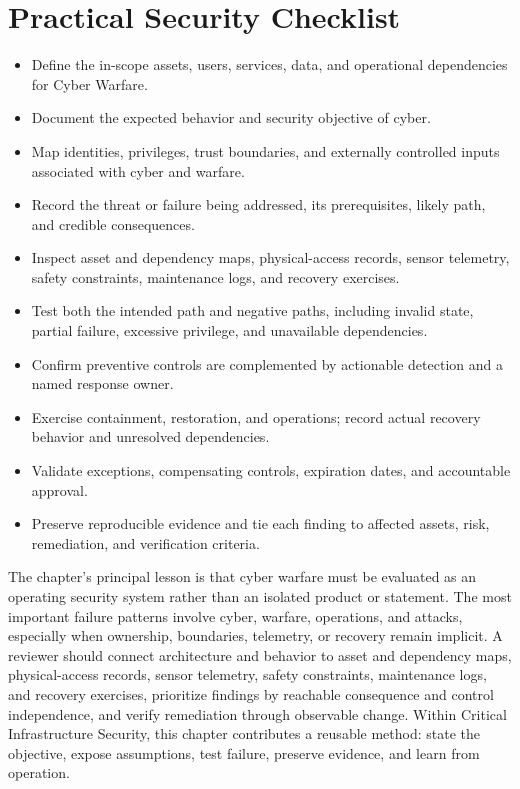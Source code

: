 \documentclass[11pt]{article}
\begin{document}
\section*{Practical Security Checklist}
\begin{itemize}[label=$\square$]
\item Define the in-scope assets, users, services, data, and operational dependencies for Cyber Warfare.
\item Document the expected behavior and security objective of cyber.
\item Map identities, privileges, trust boundaries, and externally controlled inputs associated with cyber and warfare.
\item Record the threat or failure being addressed, its prerequisites, likely path, and credible consequences.
\item Inspect asset and dependency maps, physical-access records, sensor telemetry, safety constraints, maintenance logs, and recovery exercises.
\item Test both the intended path and negative paths, including invalid state, partial failure, excessive privilege, and unavailable dependencies.
\item Confirm preventive controls are complemented by actionable detection and a named response owner.
\item Exercise containment, restoration, and operations; record actual recovery behavior and unresolved dependencies.
\item Validate exceptions, compensating controls, expiration dates, and accountable approval.
\item Preserve reproducible evidence and tie each finding to affected assets, risk, remediation, and verification criteria.
\end{itemize}
\begin{synthesisbox}
The chapter's principal lesson is that cyber warfare must be evaluated as an operating security system rather than an isolated product or statement. The most important failure patterns involve cyber, warfare, operations, and attacks, especially when ownership, boundaries, telemetry, or recovery remain implicit. A reviewer should connect architecture and behavior to asset and dependency maps, physical-access records, sensor telemetry, safety constraints, maintenance logs, and recovery exercises, prioritize findings by reachable consequence and control independence, and verify remediation through observable change. Within Critical Infrastructure Security, this chapter contributes a reusable method: state the objective, expose assumptions, test failure, preserve evidence, and learn from operation.
\end{synthesisbox}
\end{document}
